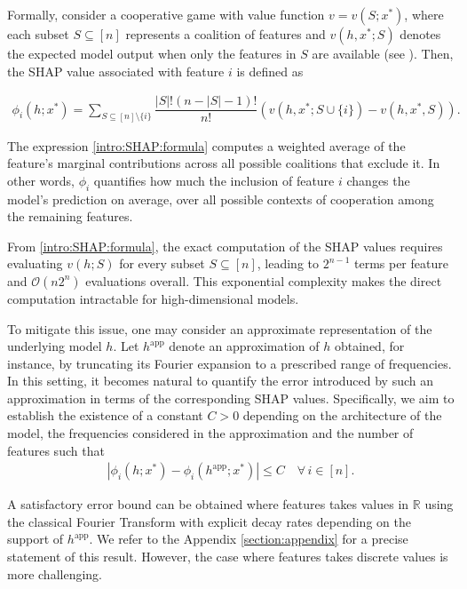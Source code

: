 \documentclass[letterpaper,11pt]{article}
\numberwithin{equation}{section}
\renewcommand{\leq}{\leqslant}
\numberwithin{equation}{section}
\begin{document}
Formally, consider a cooperative game with value function $v=v(S;x^*)$, where each subset $S\subseteq [n]$ represents a coalition of features and $v(h,x^*;S)$ denotes the expected model output when only the features in $S$ are available (see \cite{lee2017deep}). Then, the SHAP value associated with feature $i$ is defined as 

\begin{align}
    \label{intro:SHAP:formula}
    \phi_i(h;x^*)= \sum_{S\subseteq [n]\setminus \{i\}} \dfrac{|S|! (n-|S|-1)!}{n!} (v(h,x^*;S\cup \{i\}) - v(h,x^*,S)).
\end{align}

The expression \eqref{intro:SHAP:formula} computes a weighted average of the feature's marginal contributions across all possible coalitions that exclude it. In other words, $\phi_i$ quantifies how much the inclusion of feature $i$ changes the model's prediction on average, over all possible contexts of cooperation among the remaining features.

From \eqref{intro:SHAP:formula}, the exact computation of the SHAP values requires evaluating $v(h;S)$ for every subset $S\subseteq [n]$, leading to $2^{n-1}$ terms per feature and $\mathcal{O}(n2^n)$ evaluations overall. This exponential complexity makes the direct computation intractable for high-dimensional models.

To mitigate this issue, one may consider an approximate representation of the underlying model $h$. Let $h^{\text{app}}$ denote an approximation of $h$ obtained, for instance, by truncating its Fourier expansion to a prescribed range of frequencies. In this setting, it becomes natural to quantify the error introduced by such an approximation in terms of the corresponding SHAP values. Specifically, we aim to establish the existence of a constant $C>0$ depending on the architecture of the model, the frequencies considered in the approximation and the number of features such that 
\begin{align*}
    |\phi_i(h;x^*) - \phi_i(h^{\text{app}};x^*)|\leq C\quad \forall\, i\in [n].
\end{align*}

A satisfactory error bound can be obtained where features takes values in $\mathbb{R}$ using the classical Fourier Transform \cite{dautrayvol2} with explicit decay rates depending on the support of $h^{\text{app}}$. We refer to the Appendix \ref{section:appendix} for a precise statement of this result. However, the case where features takes discrete values is more challenging.
\end{document}
